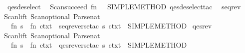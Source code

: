 \begin{isabellebody}
{}\isanewline
\isanewline
{}\isamarkupfalse%
\ qes{}deselect\ {}\ {}\isanewline
Scan{}succeed\ {}fn\ {}\ {}{}\ SIMPLE{}METHOD\ {}qes{}deselect{}tac\ {}{}{}\isanewline
{}\isanewline
\isanewline
{}\isamarkupfalse%
\ seq{}rev\ {}\ {}\isanewline
Scan{}lift\ {}Scan{}optional\ Parse{}nat\ {}{}\ {}{}\isanewline
\ \ {}fn\ s\ {}{}\ fn\ ctxt\ {}{}\ seq{}reverse{}tac\ s\ ctxt\ {}{}\ SIMPLE{}METHOD{}{}\isanewline
{}\isanewline
\isanewline
{}\isamarkupfalse%
\ qes{}rev\ {}\ {}\isanewline
Scan{}lift\ {}Scan{}optional\ Parse{}nat\ {}{}\ {}{}\isanewline
\ \ {}fn\ s\ {}{}\ fn\ ctxt\ {}{}\ qes{}reverse{}tac\ s\ ctxt\ {}{}\ SIMPLE{}METHOD{}{}\isanewline

\end{isabellebody}
